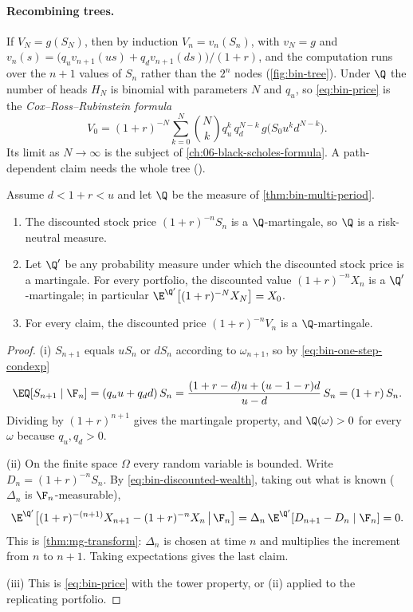 \paragraph{Recombining trees.} If $V_N=g(S_N)$, then by induction $V_n=v_n(S_n)$, with
$v_N=g$ and $v_n(s)=\big(q_uv_{n+1}(us)+q_dv_{n+1}(ds)\big)/(1+r)$, and the computation
runs over the $n+1$ values of $S_n$ rather than the $2^n$ nodes (\cref{fig:bin-tree}). Under $\Q$ the number of
heads $H_N$ is binomial with parameters $N$ and $q_u$, so \eqref{eq:bin-price} is the
\emph{Cox--Ross--Rubinstein formula}
\begin{equation}\label{eq:bin-crr}
  V_0=(1+r)^{-N}\sum_{k=0}^{N}\binom Nk q_u^k\,q_d^{N-k}\,g\big(S_0u^kd^{N-k}\big).
\end{equation}
Its limit as $N\to\infty$ is the subject of \cref{ch:06-black-scholes-formula}. A
path-dependent claim needs the whole tree ().


\begin{proposition}\label{prop:bin-discounted-martingale}
Assume $d<1+r<u$ and let $\Q$ be the measure of \cref{thm:bin-multi-period}.
\begin{enumerate}[label=(\roman*)]
  \item The discounted stock price $(1+r)^{-n}S_n$ is a $\Q$-martingale, so $\Q$ is a
    risk-neutral measure.
  \item Let $\Q'$ be any probability measure under which the discounted stock price is a
    martingale. For every portfolio, the discounted value $(1+r)^{-n}X_n$ is a
    $\Q'$-martingale; in particular $\E^{\Q'}\big[(1+r)^{-N}X_N\big]=X_0$.
  \item For every claim, the discounted price $(1+r)^{-n}V_n$ is a $\Q$-martingale.
\end{enumerate}
\end{proposition}

\begin{proof}
(i) $S_{n+1}$ equals $uS_n$ or $dS_n$ according to $\omega_{n+1}$, so by
\eqref{eq:bin-one-step-condexp}
\[
  \EQ[S_{n+1}\mid\F_n]=(q_uu+q_dd)\,S_n=\frac{(1+r-d)u+(u-1-r)d}{u-d}\,S_n=(1+r)\,S_n .
\]
Dividing by $(1+r)^{n+1}$ gives the martingale property, and $\Q(\omega)>0$ for every
$\omega$ because $q_u,q_d>0$.

(ii) On the finite space $\Omega$ every random variable is bounded. Write
$D_n=(1+r)^{-n}S_n$. By \eqref{eq:bin-discounted-wealth}, taking out what is known
($\Delta_n$ is $\F_n$-measurable),
\[
  \E^{\Q'}\big[(1+r)^{-(n+1)}X_{n+1}-(1+r)^{-n}X_n\,\big|\,\F_n\big]
  =\Delta_n\,\E^{\Q'}[D_{n+1}-D_n\mid\F_n]=0 .
\]
This is \cref{thm:mg-transform}: $\Delta_n$ is chosen at time $n$ and multiplies the
increment from $n$ to $n+1$. Taking expectations gives the last claim.

(iii) This is \eqref{eq:bin-price} with the tower property, or (ii) applied to the
replicating portfolio.
\end{proof}

